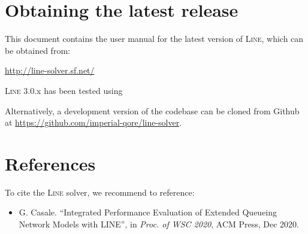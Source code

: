 \section{Obtaining the latest release}
\label{obtaining-the-latest-release}
This document contains the user manual for the latest version of \textsc{Line}, which can be obtained from:
\begin{center}
{\url{http://line-solver.sf.net/}}
\end{center}
\noindent \textsc{Line} 3.0.x has been tested using 

Alternatively, a development version of the codebase can be cloned from Github at \url{https://github.com/imperial-qore/line-solver}.


\section{References}
\label{references}
\noindent To cite the \textsc{Line} solver, we recommend to reference:
\begin{itemize}
\item \noindent G. Casale. ``Integrated Performance Evaluation of Extended Queueing Network Models with LINE'', in {\em Proc. of WSC 2020}, ACM Press, Dec 2020.
\end{itemize}


